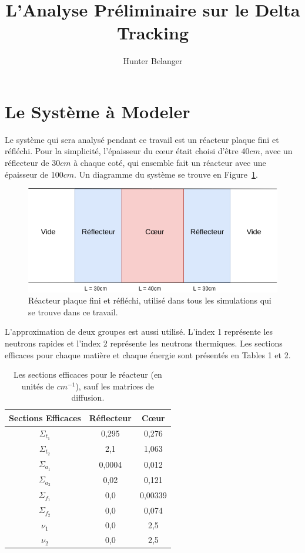 \documentclass{article}
\author{Hunter Belanger}
\title{L'Analyse Préliminaire sur le Delta Tracking}
\date{}
\begin{document}
	\maketitle
	
	\section{Le Système à Modeler}
	Le système qui sera analysé pendant ce travail est un réacteur plaque fini et réfléchi. Pour la simplicité, l'épaisseur du cœur était choisi d'être 40$cm$, avec un réflecteur de 30$cm$ à chaque coté, qui ensemble fait un réacteur avec une épaisseur de 100$cm$. Un diagramme du système se trouve en Figure~\ref{fig:réacteur}.
	
	\begin{figure}[H]
		\centering
		\includegraphics[scale=0.45]{reacteur.png}
		\caption{Réacteur plaque fini et réfléchi, utilisé dans tous les simulations qui se trouve dans ce travail.}
		\label{fig:réacteur}
	\end{figure}
	
	L'approximation de deux groupes est aussi utilisé. L'index 1 représente les neutrons rapides et l'index 2 représente les neutrons thermiques. Les sections efficaces pour chaque matière et chaque énergie sont présentés en Tables 1 et 2.
	
	\begin{table}[H]
		\centering
		\begin{tabular}{|c|c|c|}
			\hline
			\textbf{Sections Efficaces} & \textbf{Réflecteur} & \textbf{Cœur} \\ 
			\hline \hline
			$\Sigma_{t_1}$ & 0,295 & 0,276 \\
			$\Sigma_{t_2}$ & 2,1 & 1,063 \\
			\hline
			$\Sigma_{a_1}$ & 0,0004 & 0,012 \\
			$\Sigma_{a_2}$ & 0,02 & 0,121 \\
			\hline
			$\Sigma_{f_1}$ & 0,0 & 0,00339 \\
			$\Sigma_{f_2}$ & 0,0 & 0,074 \\
			\hline
			$\nu_1$ & 0,0 & 2,5 \\
			$\nu_2$ & 0,0 & 2,5 \\
			\hline
		\end{tabular}
		\caption{Les sections efficaces pour le réacteur (en unités de $cm^{-1}$), sauf les matrices de diffusion.}
	\end{table}
	
\end{document}
